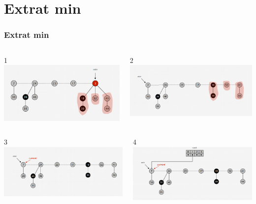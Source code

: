 \documentclass{beamer}
\begin{document}
\section{Extrat min}
\begin{frame}
 \frametitle{Extrat min}
 \begin{columns}[t]
 1
    \includegraphics[width =1 \textwidth]{imagenes/delete1.png}
      
    2
    \includegraphics[width =1 \textwidth]{imagenes/delete2.png}

   \end{columns}
   \begin{columns}[t]
   3
    \includegraphics[width =1 \textwidth]{imagenes/delete3.png}
      
    4
    \includegraphics[width =1 \textwidth]{imagenes/delete4.png}


\end{columns}
\end{frame}
\end{document}
